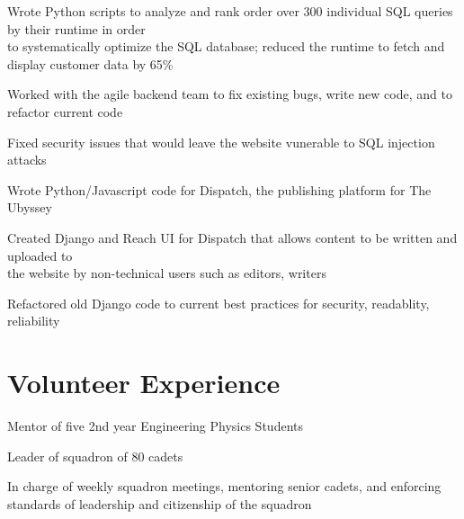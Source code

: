 \documentclass[]{deedy-resume-openfont}
\begin{document}
	\begin{tightemize}
		\item Wrote Python scripts to analyze and rank order over 300 individual SQL queries by their runtime in order \\ to systematically optimize the SQL database; reduced the runtime to fetch and display customer data by 65\%
		\item Worked with the agile backend team to fix existing bugs, write new code, and to refactor current code
		\item Fixed security issues that would leave the website vunerable to SQL injection attacks
	\end{tightemize}
	\vspace{8pt}
	
	\begin{tightemize}
		\item Wrote Python/Javascript code for Dispatch, the publishing platform for The Ubyssey
		\item Created Django and Reach UI for Dispatch that allows content to be written and uploaded to \\ the website by non-technical users such as editors, writers
		\item Refactored old Django code to current best practices for security, readablity, reliability
	\end{tightemize}
	\vspace{10pt}
	
	\section{Volunteer Experience}
	\begin{tightemize}
		\item Mentor of five 2nd year Engineering Physics Students
	\end{tightemize}
	\vspace{8pt}
	
	\begin{tightemize}
		\item Leader of squadron of 80 cadets
		\item In charge of weekly squadron meetings, mentoring senior cadets, and enforcing standards of leadership and citizenship of the squadron
	\end{tightemize}
	\vspace{10pt}
	
\end{document}

